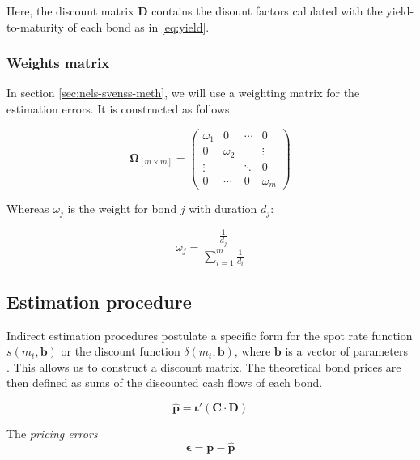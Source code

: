 Here, the discount matrix $\bm{D}$ contains the disount factors calulated with the yield-to-maturity of each bond as in \eqref{eq:yield}.

\subsubsection*{Weights matrix}

In section \ref{sec:nels-svenss-meth}, we will use a weighting matrix for the estimation errors. It is constructed  as follows.

\begin{equation*}\label{weights}
    \bm{\Omega}_{\left[m\times m\right]}= \begin{pmatrix}
 \omega_1 & 0 &\cdots  &0  \\
 0 & \omega_2 &  & \vdots \\
 \vdots &  & \ddots & 0 \\
 0 &\cdots  &0  & \omega_m
\end{pmatrix}
\end{equation*}


Whereas $\omega_j$ is the weight for bond $j$ with duration $d_j$:

\begin{displaymath}
    \omega_j=\frac{\frac{1}{d_j}}{\sum_{i=1}^m\frac{1}{d_i}}
\end{displaymath}



\subsection{Estimation procedure}
\label{sec:estimation}

Indirect estimation procedures postulate a specific form for the spot rate function $s(m_t, \bm{b})$ or the discount function $\delta(m_t, \bm{b})$, where $\bm{b}$ is a vector of parameters \citep[see, e.g.][]{Martellini2003}. This allows us to construct a discount matrix. The theoretical bond prices are then defined as sums of the discounted cash flows of each bond.

\begin{equation}
  \label{eq:theorprices}
  \bm{\hat{p}} = \bm{\iota}'(\bm{C}\cdot\bm{D})
\end{equation}



The \emph{pricing errors}
\begin{equation}
  \label{eq:pricingerrors}
  \bm{\epsilon} = \bm{p-\hat{p}}
\end{equation}

